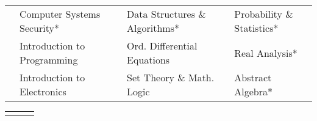

{\fontsize{11pt}{1em}\bodyfontlight\upshape\color{text}
\begin{tabular*}{\textwidth}{L{0.4cm} L{\textwidth/3 - 1cm} L{0.4cm}
  L{\textwidth/3 - 1cm} L{0.4cm} L{\textwidth/3 - 1cm}}
   & Computer Systems Security* && Data Structures \& Algorithms* & & Probability \& Statistics* \\
   & Introduction to Programming & & Ord. Differential Equations & & Real Analysis* \\
   & Introduction to Electronics & & Set Theory \& Math. Logic & & Abstract Algebra* \\
\end{tabular*}
\fontsize{11pt}{1em}\footerfont\upshape\color{text}
\begin{tabular*}{\textwidth}{L{8.4cm} L{3cm} L{3.5cm}}
  \entrylocationstyle{} &  & \\
\end{tabular*}
\vspace{-6mm}
}



